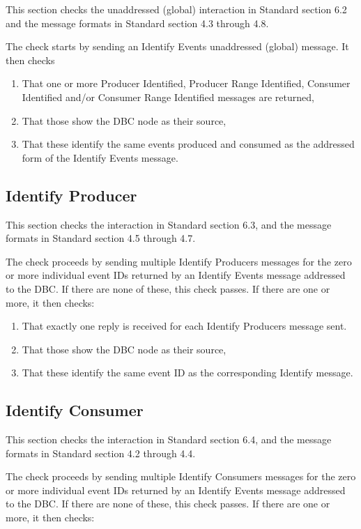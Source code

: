 This section checks the unaddressed (global) interaction in Standard section 6.2 and
the message formats in Standard section 4.3 through 4.8.

The check starts by sending an Identify Events unaddressed (global) message.
It then checks

\begin{enumerate}
\item That one or more Producer Identified, Producer Range Identified, 
        Consumer Identified and/or Consumer Range Identified messages are returned,
\item That those show the DBC node as their source,
\item That these identify the same events produced and consumed as the 
        addressed form of the Identify Events message.
\end{enumerate}

\subsection{Identify Producer}

This section checks the interaction in Standard section 6.3, and
the message formats in Standard section 4.5 through 4.7.

The check proceeds by sending multiple Identify Producers messages for 
the zero or more individual event IDs returned by an Identify Events message 
addressed to the DBC. If there are none of these, this check passes. If there
are one or more, it then checks:

\begin{enumerate}
\item That exactly one reply is received for each Identify Producers message sent.
\item That those show the DBC node as their source,
\item That these identify the same event ID as the corresponding Identify message.
\end{enumerate}

\subsection{Identify Consumer}

This section checks the interaction in Standard section 6.4, and
the message formats in Standard section 4.2 through 4.4.

The check proceeds by sending multiple Identify Consumers messages for 
the zero or more individual event IDs returned by an Identify Events message 
addressed to the DBC. If there are none of these, this check passes. If there
are one or more, it then checks:

